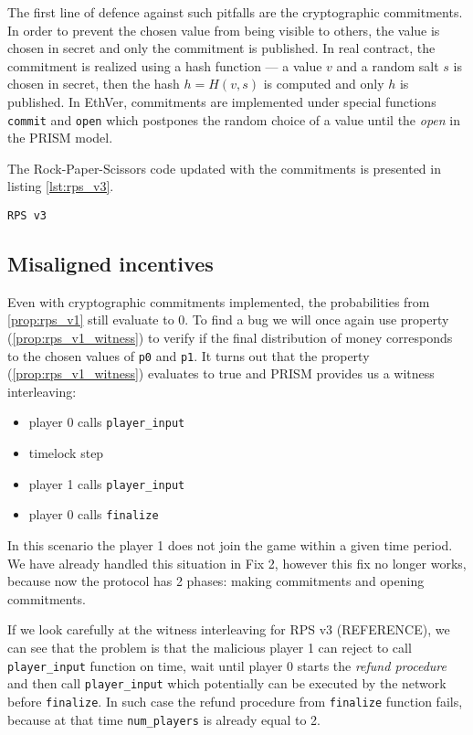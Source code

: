 The first line of defence against such pitfalls are the cryptographic commitments.
In order to prevent the chosen value from being visible to others, the value is chosen in secret and only
the commitment is published.
In real contract, the commitment is realized using a hash function --- a value $v$ and a random salt $s$ is chosen
in secret, then the hash $h = H(v, s)$ is computed and only $h$ is published.
In EthVer, commitments are implemented under special functions \lstinline{commit} and \lstinline{open} which
postpones the random choice of a value until the \emph{open} in the PRISM model.

The Rock-Paper-Scissors code updated with the commitments is presented in listing \ref{lst:rps_v3}.

%
\begin{lstlisting}[caption=RPS v3, label=lst:rps_v3]
RPS v3
\end{lstlisting}


\subsection{Misaligned incentives}

Even with cryptographic commitments implemented, the probabilities from \ref{prop:rps_v1} still evaluate to 0.
To find a bug we will once again use property (\ref{prop:rps_v1_witness}) to verify if the final distribution of money
corresponds to the chosen values of \lstinline{p0} and \lstinline{p1}.
It turns out that the property (\ref{prop:rps_v1_witness}) evaluates to true and PRISM provides us a witness 
interleaving:
\begin{itemize}
\item player 0 calls \lstinline{player_input}
\item timelock step
\item player 1 calls \lstinline{player_input}
\item player 0 calls \lstinline{finalize}
\end{itemize}
In this scenario the player 1 does not join the game within a given time period.
We have already handled this situation in Fix 2, however this fix no longer works, because now the protocol
has 2 phases: making commitments and opening commitments.

If we look carefully at the witness interleaving for RPS v3 (REFERENCE), we can see that the problem is
that the malicious player 1 can reject to call \lstinline{player_input} function on time, wait until player 0 starts
the \emph{refund procedure} and then call \lstinline{player_input} which potentially can be executed by the 
network before \lstinline{finalize}.
In such case the refund procedure from \lstinline{finalize} function fails, because at that time
\lstinline{num_players} is already equal to 2.

